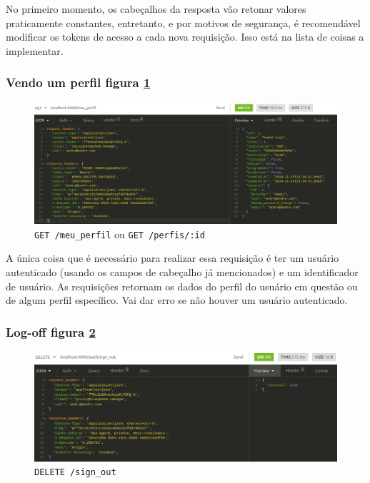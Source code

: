 No primeiro momento, os cabeçalhos da resposta vão retonar valores praticamente constantes, entretanto, e por motivos de
segurança, é recomendável modificar os tokens de acesso a cada nova requisição. Isso está na lista de coisas a implementar.

\subsubsection{Vendo um perfil \hfill figura \ref{fig:ver-perfil}}

\begin{figure}[ht]
    \centering
    \includegraphics[width=.75\textwidth]{figuras/ver-perfil.png}
    \caption{\texttt{GET /meu\_perfil} ou \texttt{GET /perfis/:id}}
    \label{fig:ver-perfil}
\end{figure}

A única coisa que é necessário para realizar essa requisição é ter um usuário autenticado (usando os campos de cabeçalho
já mencionados) e um identificador de usuário. As requisições retornam os dados do perfil do usuário em questão ou de
algum perfil específico. Vai dar erro se não houver um usuário autenticado.

\subsubsection{Log-off \hfill figura \ref{fig:saindo}}

\begin{figure}[ht]
    \centering
    \includegraphics[width=.75\textwidth]{figuras/sign-out.png}
    \caption{\texttt{DELETE /sign\_out}}
    \label{fig:saindo}
\end{figure}

